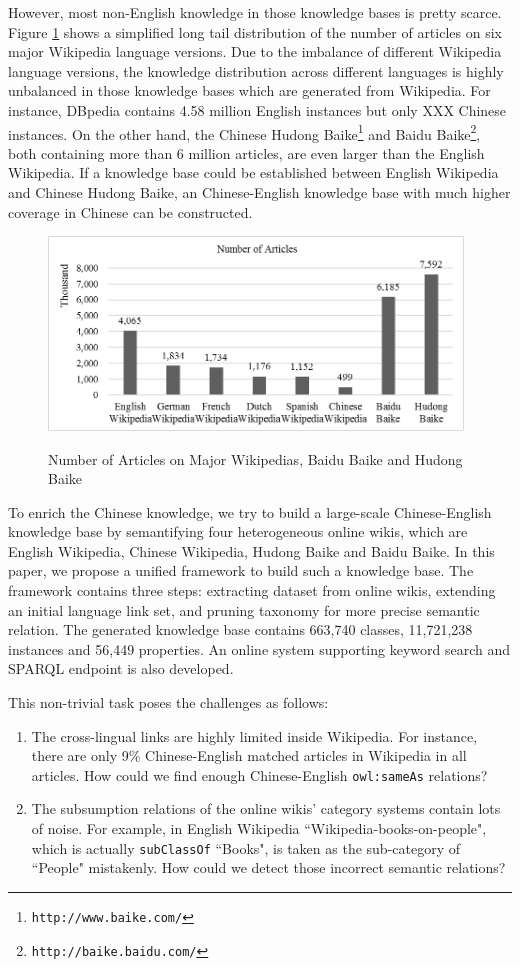 \documentclass[runningheads,a4paper]{llncs}
\begin{document}
However, most non-English knowledge in those knowledge bases is pretty scarce. Figure \ref{fig_stat} shows a simplified long tail distribution of the number of articles on six major Wikipedia language versions. Due to the imbalance of different Wikipedia language versions, the knowledge distribution across different languages is highly unbalanced in those knowledge bases which are generated from Wikipedia. For instance, DBpedia contains 4.58 million English instances but only XXX Chinese instances. On the other hand, the Chinese Hudong Baike\footnote{{\tt http://www.baike.com/}} and Baidu Baike\footnote{{\tt http://baike.baidu.com/}}, both containing more than 6 million articles, are even larger than the English Wikipedia. If a knowledge base could be established between English Wikipedia and Chinese Hudong Baike, an Chinese-English knowledge base with much higher coverage in Chinese can be constructed.
\begin{figure}[h]
\centering
  \includegraphics[width=11cm]{fig/fig_stat.png}\\
  \caption{Number of Articles on Major Wikipedias, Baidu Baike and Hudong Baike}
  \label{fig_stat}
\end{figure}

To enrich the Chinese knowledge, we try to build a large-scale Chinese-English knowledge base by semantifying four heterogeneous online wikis, which are English Wikipedia, Chinese Wikipedia, Hudong Baike and Baidu Baike. In this paper, we propose a unified framework to build such a knowledge base. The framework contains three steps: extracting dataset from online wikis, extending an initial language link set, and pruning taxonomy for more precise semantic relation. The generated knowledge base contains 663,740 classes, 11,721,238 instances and 56,449 properties. An online system supporting keyword search and SPARQL endpoint is also developed.

This non-trivial task poses the challenges as follows:
\begin{enumerate}
  \item The cross-lingual links are highly limited inside Wikipedia. For instance, there are only 9\% Chinese-English matched articles in Wikipedia in all articles. How could we find enough Chinese-English \verb"owl:sameAs" relations?
  \item The subsumption relations of the online wikis' category systems contain lots of noise. For example, in English Wikipedia ``Wikipedia-books-on-people", which is actually \verb"subClassOf" ``Books", is taken as the sub-category of ``People" mistakenly. How could we detect those incorrect semantic relations?
\end{enumerate}
\end{document}
